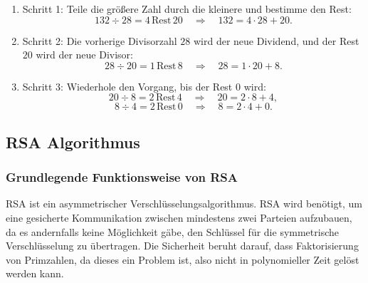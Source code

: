 \begin{enumerate}
    \item Schritt 1:
    Teile die größere Zahl durch die kleinere und bestimme den Rest:  
    \[
    132 \div 28 = 4 \, \text{Rest} \, 20 \quad \Rightarrow \quad 132 = 4 \cdot 28 + 20.
    \]

    \item Schritt 2:
    Die vorherige Divisorzahl $28$ wird der neue Dividend, und der Rest $20$ wird der neue Divisor:  
    \[
    28 \div 20 = 1 \, \text{Rest} \, 8 \quad \Rightarrow \quad 28 = 1 \cdot 20 + 8.
    \]

    \item Schritt 3:
    Wiederhole den Vorgang, bis der Rest $0$ wird:  
    \[
    20 \div 8 = 2 \, \text{Rest} \, 4 \quad \Rightarrow \quad 20 = 2 \cdot 8 + 4,
    \]  
    \[
    8 \div 4 = 2 \, \text{Rest} \, 0 \quad \Rightarrow \quad 8 = 2 \cdot 4 + 0.
    \]
\end{enumerate}

\subsection{RSA Algorithmus}
\subsubsection{Grundlegende Funktionsweise von RSA}
RSA ist ein asymmetrischer Verschlüsselungsalgorithmus.
RSA wird benötigt, um eine gesicherte Kommunikation zwischen mindestens zwei Parteien aufzubauen, da 
es andernfalls keine Möglichkeit gäbe, den Schlüssel für die symmetrische Verschlüsselung  zu übertragen.
Die Sicherheit beruht darauf, dass Faktorisierung von Primzahlen, da dieses ein  Problem ist\cite{moolchad_leveraging_nodate},
also nicht in polynomieller Zeit gelöst werden kann. 

